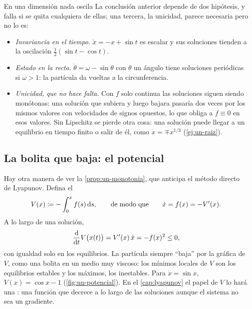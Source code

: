 \begin{trampa}[label=tr:un-oscilar]{En una dimensión nada oscila}
La conclusión anterior depende de dos hipótesis, y falla si se quita cualquiera de ellas; una tercera, la unicidad, parece necesaria pero no lo es:
\begin{itemize}
  \item \emph{Invariancia en el tiempo.} $\dot x=-x+\sin t$ es escalar y sus soluciones tienden a la oscilación $\tfrac12(\sin t-\cos t)$.
  \item \emph{Estado en la recta.} $\dot\theta=\omega-\sin\theta$ con $\theta$ un ángulo tiene soluciones periódicas si $\omega>1$: la partícula da vueltas a la circunferencia.
  \item \emph{Unicidad, que no hace falta.} Con $f$ solo continua las soluciones siguen siendo monótonas: una solución que subiera y luego bajara pasaría dos veces por los mismos valores con velocidades de signos opuestos, lo que obliga a $f\equiv0$ en esos valores. Sin Lipschitz se pierde otra cosa: una solución puede llegar a un equilibrio en tiempo finito o salir de él, como $\dot x=\mp x^{1/3}$ (\cref{ej:un-raiz}).
\end{itemize}
\end{trampa}

\subsection{La bolita que baja: el potencial}
\label{sec:un-potencial}

Hay otra manera de ver la \cref{prop:un-monotonia}, que anticipa el método directo de Lyapunov. Defina el 
\begin{equation}
  V(x)\coloneqq-\int_0^xf(s)\,\mathrm{d} s,\qquad\text{de modo que}\qquad\dot x=f(x)=-V'(x) .
  \label{eq:un-potencial}
\end{equation}
A lo largo de una solución,
\[
  \frac{\mathrm{d}}{\mathrm{d} t}V\bigl(x(t)\bigr)=V'(x)\,\dot x=-f(x)^2\le0 ,
\]
con igualdad solo en los equilibrios. La partícula siempre ``baja'' por la gráfica de $V$, como una bolita en un medio muy viscoso: los mínimos locales de $V$ son los equilibrios estables y los máximos, los inestables. Para $\dot x=\sin x$, $V(x)=\cos x-1$ (\cref{fig:un-potencial}). En el \cref{cap:lyapunov} el papel de $V$ lo hará una : una función que decrece a lo largo de las soluciones aunque el sistema no sea un gradiente.

